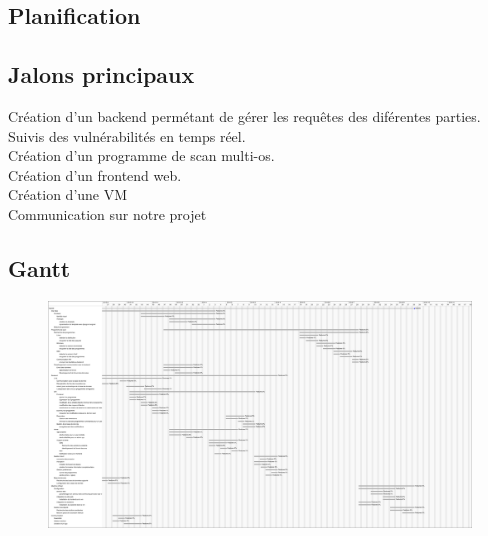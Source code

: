 \textcolor{myBlue}{\chapter{Planification}}
\section{Jalons principaux}
Création d'un backend permétant de gérer les requêtes des diférentes parties.\\
Suivis des vulnérabilités en temps réel.\\
Création d'un programme de scan multi-os.\\
Création d'un frontend web.\\
Création d'une VM\\
Communication sur notre projet\\

\section{Gantt}


\begin{figure}
\includegraphics[width=18cm]{vigilate-gantt.png}
\end{figure}
